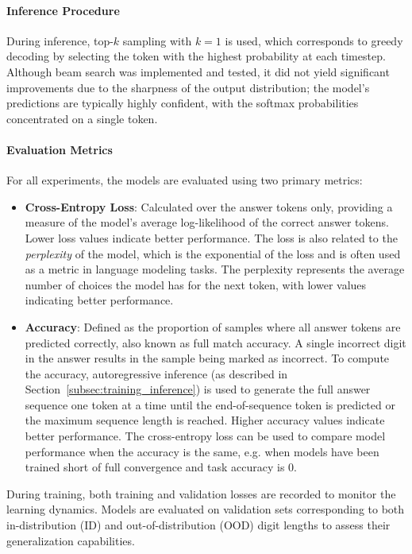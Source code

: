 \paragraph{Inference Procedure}
During inference, top-$k$ sampling with $k=1$ is used, which corresponds to greedy decoding by selecting the token with the highest probability at each timestep. Although beam search was implemented and tested, it did not yield significant improvements due to the sharpness of the output distribution; the model's predictions are typically highly confident, with the softmax probabilities concentrated on a single token.

\paragraph{Evaluation Metrics}
For all experiments, the models are evaluated using two primary metrics:

\begin{itemize}
    \item \textbf{Cross-Entropy Loss}: Calculated over the answer tokens only, providing a measure of the model's average log-likelihood of the correct answer tokens. Lower loss values indicate better performance. The loss is also related to the \emph{perplexity} of the model, which is the exponential of the loss and is often used as a metric in language modeling tasks. The perplexity represents the average number of choices the model has for the next token, with lower values indicating better performance.
    \item \textbf{Accuracy}: Defined as the proportion of samples where all answer tokens are predicted correctly, also known as full match accuracy. A single incorrect digit in the answer results in the sample being marked as incorrect. To compute the accuracy, autoregressive inference (as described in Section~\ref{subsec:training_inference}) is used to generate the full answer sequence one token at a time until the end-of-sequence token is predicted or the maximum sequence length is reached. Higher accuracy values indicate better performance. The cross-entropy loss can be used to compare model performance when the accuracy is the same, e.g. when models have been trained short of full convergence and task accuracy is 0.
\end{itemize}

During training, both training and validation losses are recorded to monitor the learning dynamics. Models are evaluated on validation sets corresponding to both in-distribution (ID) and out-of-distribution (OOD) digit lengths to assess their generalization capabilities.


